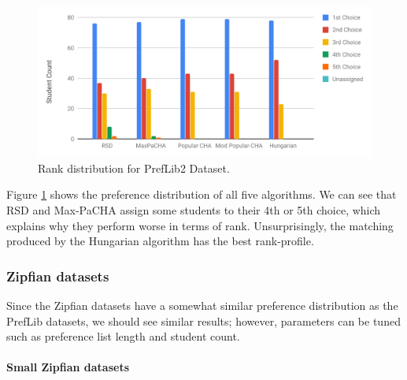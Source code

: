 \begin{figure}[h!]
  \centering
    \includegraphics[width=0.9\linewidth]{assets/plots/preflib2-ranks.pdf}
    \caption{Rank distribution for PrefLib2 Dataset.}
    \label{fig:preflib2-rank-distribution}
\end{figure}

Figure \ref{fig:preflib2-rank-distribution} shows the preference distribution of all five algorithms. We can see that RSD and Max-PaCHA assign some students to their 4th or 5th choice, which explains why they perform worse in terms of rank. Unsurprisingly, the matching produced by the Hungarian algorithm has the best rank-profile.

\subsubsection{Zipfian datasets}
Since the Zipfian datasets have a somewhat similar preference distribution as the PrefLib datasets, we should see similar results; however, parameters can be tuned such as preference list length and student count.

\paragraph{Small Zipfian datasets}

